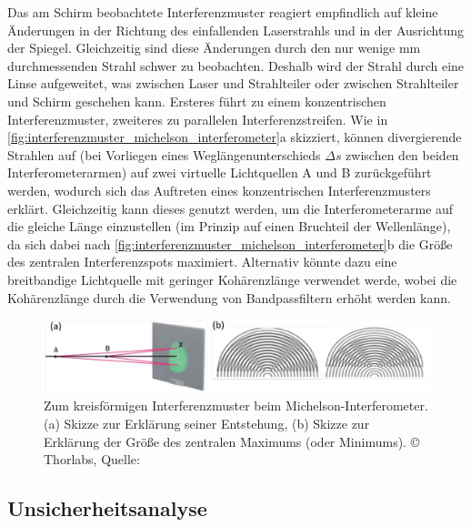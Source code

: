 \documentclass[ngerman]{scrartcl}
\begin{document}
Das am Schirm beobachtete Interferenzmuster reagiert empfindlich auf kleine Änderungen in der Richtung des einfallenden Laserstrahls und in der Ausrichtung der Spiegel. Gleichzeitig sind diese Änderungen durch den nur wenige mm durchmessenden Strahl schwer zu beobachten. Deshalb wird der Strahl durch eine Linse aufgeweitet, was zwischen Laser und Strahlteiler oder zwischen Strahlteiler und Schirm geschehen kann. Ersteres führt zu einem konzentrischen Interferenzmuster, zweiteres zu parallelen Interferenzstreifen. Wie in \autoref{fig:interferenzmuster_michelson_interferometer}a skizziert, können divergierende Strahlen auf (bei Vorliegen eines Weglängenunterschieds $\Delta s$ zwischen den beiden Interferometerarmen) auf zwei virtuelle Lichtquellen A und B zurückgeführt werden, wodurch sich das Auftreten eines konzentrischen Interferenzmusters erklärt. Gleichzeitig kann dieses genutzt werden, um die Interferometerarme auf die gleiche Länge einzustellen (im Prinzip auf einen Bruchteil der Wellenlänge), da sich dabei nach \autoref{fig:interferenzmuster_michelson_interferometer}b die Größe des zentralen Interferenzspots maximiert. Alternativ könnte dazu eine breitbandige Lichtquelle mit geringer Kohärenzlänge verwendet werde, wobei die Kohärenzlänge durch die Verwendung von Bandpassfiltern erhöht werden kann.

\begin{figure}[H]
    \centering
    \begin{samepage}
        \includegraphics[width=\linewidth]{fig/Angabe_Abb9.png}
        \caption[Interferenzmuster Michelson-Interferometer]{Zum kreisförmigen Interferenzmuster beim Michelson-Interferometer. (a) Skizze zur Erklärung seiner Entstehung, (b) Skizze zur Erklärung der Größe des zentralen Maximums (oder Minimums). \copyright{} Thorlabs, Quelle: \cite{ref:angabe}}
        \label{fig:interferenzmuster_michelson_interferometer}
    \end{samepage}
\end{figure}

\subsection{Unsicherheitsanalyse}
\label{subsec:unsicherheitsanalyse}
\end{document}
